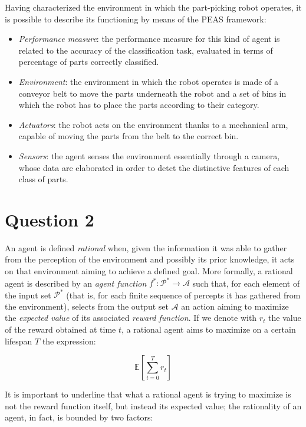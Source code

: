 \documentclass[letterpaper,headings=standardclasses]{scrartcl}
\begin{document}
Having characterized the environment in which the part-picking robot operates, it is possible to describe its functioning by means of the PEAS framework:

\begin{itemize}

\item \emph{Performance measure}: the performance measure for this kind of agent is related to the accuracy of the classification task, evaluated in terms of percentage of parts correctly classified.

\item \emph{Environment}: the environment in which the robot operates is made of a conveyor belt to move the parts underneath the robot and a set of bins in which the robot has to place the parts according to their category.

\item \emph{Actuators}: the robot acts on the environment thanks to a mechanical arm, capable of moving the parts from the belt to the correct bin.

\item \emph{Sensors}: the agent senses the environment essentially through a camera, whose data are elaborated in order to detct the distinctive features of each class of parts.

\end{itemize}

\section{Question 2}

An agent is defined \emph{rational} when, given the information it was able to gather from the perception of the environment and possibly its prior knowledge, it acts on that environment aiming to achieve a defined goal. More formally, a rational agent is described by an \emph{agent function} $ f^* : \mathcal{P}^* \rightarrow \mathcal{A} $ such that, for each element of the input set $ \mathcal{P}^* $ (that is, for each finite sequence of percepts it has gathered from the environment), selects from the output set $ \mathcal{A} $ an action aiming to maximize the \emph{expected value} of its associated \emph{reward function}. If we denote with $r_t$ the value of the reward obtained at time $t$, a rational agent aims to maximize on a certain lifespan $T$ the expression:

$$ \mathbb{E} \left[ \sum_{t=0}^{T} r_t \right] $$

It is important to underline that what a rational agent is trying to maximize is not the reward function itself, but instead its expected value; the rationality of an agent, in fact, is bounded by two factors:
\end{document}
